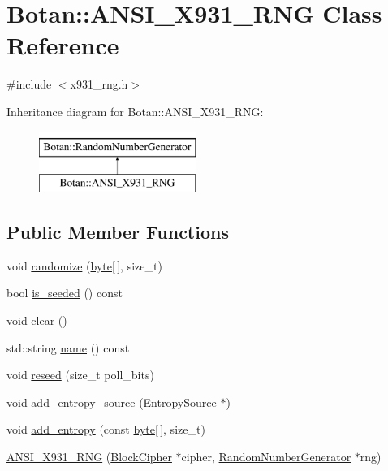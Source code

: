 \hypertarget{classBotan_1_1ANSI__X931__RNG}{\section{Botan\-:\-:A\-N\-S\-I\-\_\-\-X931\-\_\-\-R\-N\-G Class Reference}
\label{classBotan_1_1ANSI__X931__RNG}
}


{\ttfamily \#include $<$x931\-\_\-rng.\-h$>$}

Inheritance diagram for Botan\-:\-:A\-N\-S\-I\-\_\-\-X931\-\_\-\-R\-N\-G\-:\begin{figure}[H]
\begin{center}
\leavevmode
\includegraphics[height=2.000000cm]{classBotan_1_1ANSI__X931__RNG}
\end{center}
\end{figure}
\subsection*{Public Member Functions}
\begin{DoxyCompactItemize}
\item 
void \hyperlink{classBotan_1_1ANSI__X931__RNG_aa467e6846004e72e3032c07192b5c4b0}{randomize} (\hyperlink{namespaceBotan_a7d793989d801281df48c6b19616b8b84}{byte}\mbox{[}$\,$\mbox{]}, size\-\_\-t)
\item 
bool \hyperlink{classBotan_1_1ANSI__X931__RNG_ae8be7ca130c608b1612edf4cf7e22d69}{is\-\_\-seeded} () const 
\item 
void \hyperlink{classBotan_1_1ANSI__X931__RNG_a194063e8336a972571e2360c60d8f2e1}{clear} ()
\item 
std\-::string \hyperlink{classBotan_1_1ANSI__X931__RNG_a9ce10e0ff163da11a9c4e85f23347c3b}{name} () const 
\item 
void \hyperlink{classBotan_1_1ANSI__X931__RNG_a826e4f3a6fdd9bc1de5c27d2e4ce38db}{reseed} (size\-\_\-t poll\-\_\-bits)
\item 
void \hyperlink{classBotan_1_1ANSI__X931__RNG_acacdeae2432b2e25420bb2121d4052c0}{add\-\_\-entropy\-\_\-source} (\hyperlink{classBotan_1_1EntropySource}{Entropy\-Source} $\ast$)
\item 
void \hyperlink{classBotan_1_1ANSI__X931__RNG_aa0aec44d5cefe106e26ffd5a9e1493a2}{add\-\_\-entropy} (const \hyperlink{namespaceBotan_a7d793989d801281df48c6b19616b8b84}{byte}\mbox{[}$\,$\mbox{]}, size\-\_\-t)
\item 
\hyperlink{classBotan_1_1ANSI__X931__RNG_a8edc36aa1cd88bed21071b1ddd645979}{A\-N\-S\-I\-\_\-\-X931\-\_\-\-R\-N\-G} (\hyperlink{classBotan_1_1BlockCipher}{Block\-Cipher} $\ast$cipher, \hyperlink{classBotan_1_1RandomNumberGenerator}{Random\-Number\-Generator} $\ast$rng)
\end{DoxyCompactItemize}
